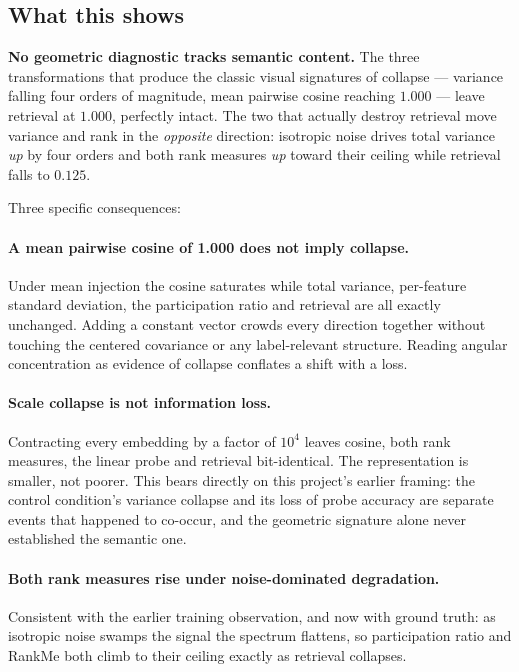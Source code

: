 \subsection{What this shows}

\ours{} \textbf{No geometric diagnostic tracks semantic content.} The three
transformations that produce the classic visual signatures of collapse --- variance
falling four orders of magnitude, mean pairwise cosine reaching $1.000$ --- leave
retrieval at $1.000$, perfectly intact. The two that actually destroy retrieval move
variance and rank in the \emph{opposite} direction: isotropic noise drives total variance
\emph{up} by four orders and both rank measures \emph{up} toward their ceiling while
retrieval falls to $0.125$.

Three specific consequences:

\paragraph{A mean pairwise cosine of 1.000 does not imply collapse.} Under mean injection
the cosine saturates while total variance, per-feature standard deviation, the
participation ratio and retrieval are all exactly unchanged. Adding a constant vector
crowds every direction together without touching the centered covariance or any
label-relevant structure. Reading angular concentration as evidence of collapse conflates
a shift with a loss.

\paragraph{Scale collapse is not information loss.} Contracting every embedding by a
factor of $10^{4}$ leaves cosine, both rank measures, the linear probe and retrieval
bit-identical. The representation is smaller, not poorer. \interp{} This bears directly on
this project's earlier framing: the control condition's variance collapse and its loss of
probe accuracy are separate events that happened to co-occur, and the geometric signature
alone never established the semantic one.

\paragraph{Both rank measures rise under noise-dominated degradation.} Consistent with the
earlier training observation, and now with ground truth: as isotropic noise swamps the
signal the spectrum flattens, so participation ratio and RankMe both climb to their
ceiling exactly as retrieval collapses.

